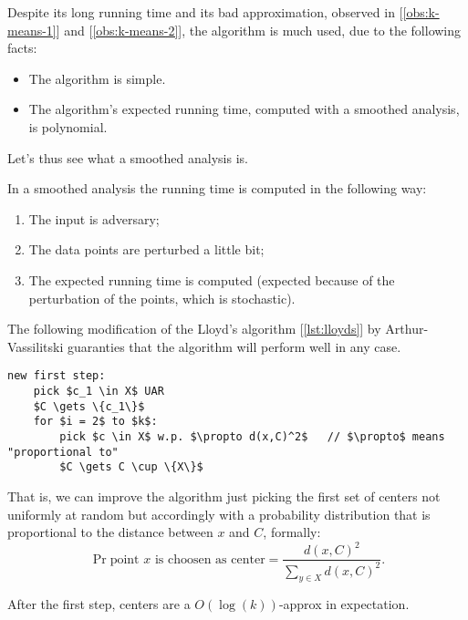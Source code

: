 Despite its long running time and its bad approximation, observed in [\ref{obs:k-means-1}] and [\ref{obs:k-means-2}], the algorithm is much used, due to the following facts:
\begin{itemize}
    \item The algorithm is simple.
    \item The algorithm's expected running time, computed with a smoothed analysis, is polynomial.
\end{itemize}
%
Let's thus see what a smoothed analysis is.
%
\begin{defn}
    In a smoothed analysis the running time is computed in the following way:
    \begin{enumerate}
        \item The input is adversary;
        \item The data points are perturbed a little bit;
        \item The expected running time is computed (expected because of the perturbation of the points, which is stochastic).
    \end{enumerate}
\end{defn}

The following modification of the Lloyd's algorithm [\ref{lst:lloyds}] by Arthur-Vassilitski guaranties that the algorithm will perform well in any case.
\begin{lstlisting}[caption={kmeans++}, label={lst:arthurv-assilitski}]
new first step:
    pick $c_1 \in X$ UAR
    $C \gets \{c_1\}$
    for $i = 2$ to $k$:
        pick $c \in X$ w.p. $\propto d(x,C)^2$   // $\propto$ means "proportional to"
        $C \gets C \cup \{X\}$
\end{lstlisting}
That is, we can improve the algorithm just picking the first set of centers not uniformly at random but accordingly with a probability distribution that is proportional to the distance between $x$ and $C$, formally:
\begin{equation}
    \Pr{\text{point $x$ is choosen as center}} = \frac{d(x,C)^2}{\sum_{y \in X} d(x,C)^2}.
\end{equation}

\begin{claim}
    After the first step, centers are a $O(\log(k))$-approx in expectation.
\end{claim}

